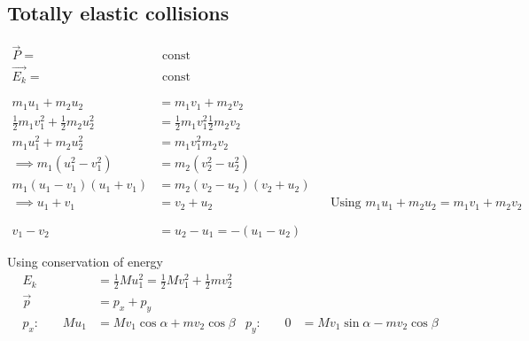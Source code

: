 \documentclass[12pt]{article}
\begin{document}
\subsection{Totally elastic collisions}
\begin{align*}
	\overrightarrow{P} =                          & \text{ const}                                                                                     \\
	\overrightarrow{E_k} =                        & \text{ const}                                                                                     \\
	\phantom{=}                                                                                                                                       \\
	m_1 u_1 + m_2 u_2                             & = m_1 v_1 + m_2 v_2                                                                               \\
	\frac{1}{2} m_1 v_1^2 + \frac{1}{2} m_2 u_2^2 & = \frac{1}{2} m_1 v_1^2 \frac{1}{2} m_2 v_2                                                       \\
	m_1 u_1^2 + m_2 u_2^2                         & = m_1 v_1^2 m_2 v_2                                                                               \\
	\implies m_1(u_1^2 - v_1^2)                   & = m_2(v_2^2 - u_2^2)                                                                              \\
	m_1(u_1 - v_1)(u_1 + v_1)                     & = m_2(v_2 - u_2)(v_2 + u_2)                                                                       \\
	\implies u_1 + v_1                            & = v_2 + u_2
	                                              &                                             & \text{Using } m_1 u_1 + m_2 u_2 = m_1 v_1 + m_2 v_2 \\
	\phantom{=}                                                                                                                                       \\
	v_1 - v_2                                     & = u_2 - u_1 = -(u_1 - u_2)
\end{align*}

Using conservation of energy
\begin{align*}
	E_k                      & = \frac{1}{2} M u_1^2 = \frac{1}{2} M v_1^2 + \frac{1}{2} m v_2^2                                           \\
	\overrightarrow{p}       & = p_x + p_y                                                                                                 \\
	p_x \text{:} \qquad Mu_1 & = M v_1 \cos{\alpha} + m v_2 \cos{\beta}
	                         & p_y \text{:} \qquad 0                                             & = M v_1 \sin{\alpha} - mv_2 \cos{\beta}
\end{align*}
\end{document}

